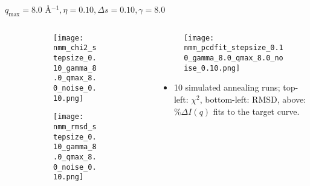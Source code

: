 \documentclass{beamer}
\begin{document}
\begin{frame}{$ q_{\textrm{max}}=8.0 $ \AA $^{-1}, \eta=0.10, \Delta s=0.10, \gamma=8.0$}
	\begin{columns}
		\begin{column}{.5\textwidth}
			\begin{figure}[H]
			\centering
			\begin{subfigure}[b]{\textwidth}
				\centering
				\texttt{[image: nmm\_chi2\_stepsize\_0.10\_gamma\_8.0\_qmax\_8.0\_noise\_0.10.png]}
				\label{fig:}
			\end{subfigure}
			\begin{subfigure}[b]{\textwidth}
				\centering
				\texttt{[image: nmm\_rmsd\_stepsize\_0.10\_gamma\_8.0\_qmax\_8.0\_noise\_0.10.png]}
				\label{fig:}
			\end{subfigure}
			\end{figure}
		\end{column}
		\begin{column}{.5\textwidth}
			\begin{figure}[H]
				\centering
				\texttt{[image: nmm\_pcdfit\_stepsize\_0.10\_gamma\_8.0\_qmax\_8.0\_noise\_0.10.png]}
				\label{fig:}
			\end{figure}
			\begin{itemize}
				\item 10 simulated annealing runs; top-left: $\chi^2$, bottom-left: RMSD, above: $\%\Delta I(q)$ fits to the target curve.
			\end{itemize}
		\end{column}
	\end{columns}
\end{frame}
 
\end{document}
